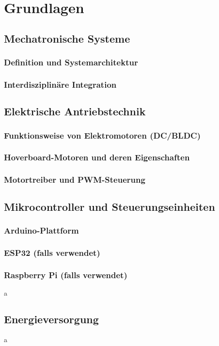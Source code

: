 \chapter{Grundlagen}
\label{cha:Grundlagen}


\section{Mechatronische Systeme}
\subsection{Definition und Systemarchitektur}
\subsection{Interdisziplinäre Integration}

\section{Elektrische Antriebstechnik}
\subsection{Funktionsweise von Elektromotoren (DC/BLDC)}
\subsection{Hoverboard-Motoren und deren Eigenschaften}
\subsection{Motortreiber und PWM-Steuerung}

\section{Mikrocontroller und Steuerungseinheiten}
\subsection{Arduino-Plattform}
\subsection{ESP32 (falls verwendet)}
\subsection{Raspberry Pi (falls verwendet)}
a
\section{Energieversorgung}
a
